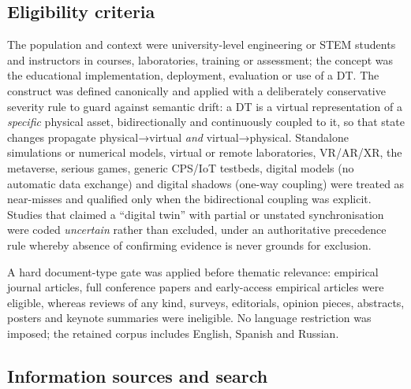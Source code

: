 \subsection{Eligibility criteria}\label{eligibility-criteria}

The population and context were university-level engineering or STEM students and
instructors in courses, laboratories, training or assessment; the concept was the
educational implementation, deployment, evaluation or use of a DT. The construct
was defined canonically and applied with a deliberately conservative severity rule
to guard against semantic drift: a DT is a virtual representation of a \emph{specific}
physical asset, bidirectionally and continuously coupled to it, so that state
changes propagate physical→virtual \emph{and} virtual→physical. Standalone simulations
or numerical models, virtual or remote laboratories, VR/AR/XR, the metaverse,
serious games, generic CPS/IoT testbeds, digital models (no automatic data
exchange) and digital shadows (one-way coupling) were treated as near-misses and
qualified only when the bidirectional coupling was explicit. Studies that claimed
a ``digital twin'' with partial or unstated synchronisation were coded \emph{uncertain}
rather than excluded, under an authoritative precedence rule whereby absence of
confirming evidence is never grounds for exclusion.

A hard document-type gate was applied before thematic relevance: empirical journal
articles, full conference papers and early-access empirical articles were
eligible, whereas reviews of any kind, surveys, editorials, opinion pieces,
abstracts, posters and keynote summaries were ineligible. No language restriction
was imposed; the retained corpus includes English, Spanish and Russian.

\subsection{Information sources and search}\label{information-sources-and-search}

